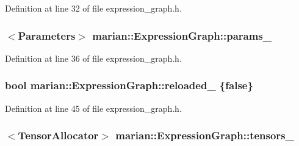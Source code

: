 Definition at line 32 of file expression\+\_\+graph.\+h.

\subsubsection[{\texorpdfstring{params\+\_\+}{params_}}]{$<${\bf Parameters}$>$ marian\+::\+Expression\+Graph\+::params\+\_\+\hspace{0.3cm}{\ttfamily [private]}}\hypertarget{classmarian_1_1ExpressionGraph_a6abcd5dad584fa5abd9b55b75bb5ef87}{}\label{classmarian_1_1ExpressionGraph_a6abcd5dad584fa5abd9b55b75bb5ef87}


Definition at line 36 of file expression\+\_\+graph.\+h.

\subsubsection[{\texorpdfstring{reloaded\+\_\+}{reloaded_}}]{\setlength{\rightskip}{0pt plus 5cm}bool marian\+::\+Expression\+Graph\+::reloaded\+\_\+ \{false\}\hspace{0.3cm}{\ttfamily [private]}}\hypertarget{classmarian_1_1ExpressionGraph_aa10988c85ca38b3a1ffd72fa42278987}{}\label{classmarian_1_1ExpressionGraph_aa10988c85ca38b3a1ffd72fa42278987}


Definition at line 45 of file expression\+\_\+graph.\+h.

\subsubsection[{\texorpdfstring{tensors\+\_\+}{tensors_}}]{$<${\bf Tensor\+Allocator}$>$ marian\+::\+Expression\+Graph\+::tensors\+\_\+\hspace{0.3cm}{\ttfamily [private]}}\hypertarget{classmarian_1_1ExpressionGraph_a87f5a687e1d22e0db5e6304540c5e671}{}\label{classmarian_1_1ExpressionGraph_a87f5a687e1d22e0db5e6304540c5e671}


